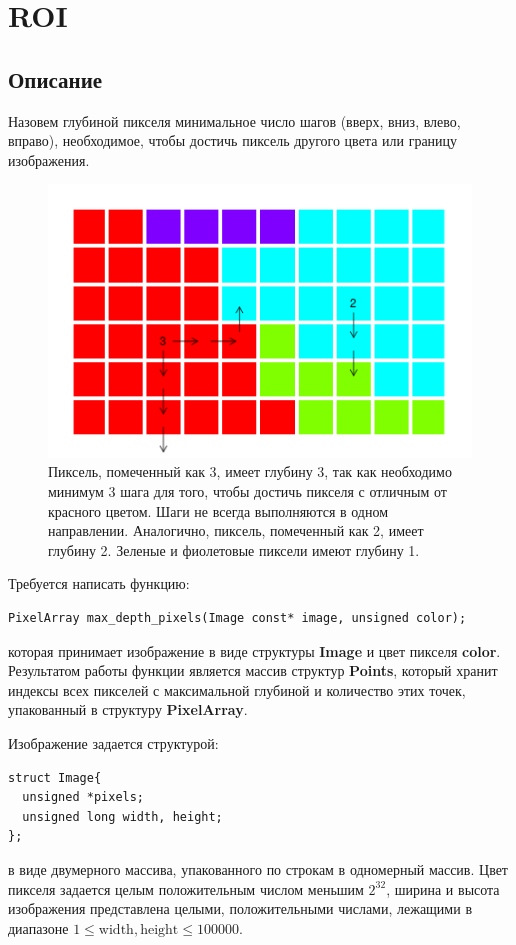 \documentclass[14pt]{article}
\begin{document}
\section{ROI}
\subsection{Описание}
Назовем глубиной пикселя минимальное число шагов (вверх, вниз, влево, вправо), необходимое, чтобы достичь пиксель другого цвета или границу изображения. 
\begin{figure}[ht]
    \centering
    \includegraphics[width=0.75\linewidth]{pixeldepthspic.png}
    \caption{\label{fig:demo} Пиксель, помеченный как 3, имеет глубину 3, так как необходимо минимум 3 шага для того, чтобы достичь пикселя с отличным от красного цветом. Шаги не всегда выполняются в одном направлении. Аналогично, пиксель, помеченный как 2, имеет глубину 2. Зеленые и фиолетовые пиксели имеют глубину 1. }
\end{figure}

Требуется написать функцию:
\begin{lstlisting}
PixelArray max_depth_pixels(Image const* image, unsigned color);
\end{lstlisting}
которая принимает изображение в виде структуры \textbf{Image} и цвет пикселя \textbf{color}. Результатом работы функции является массив структур \textbf{Points}, который хранит индексы всех пикселей с максимальной глубиной и количество этих точек, упакованный в структуру \textbf{PixelArray}. 

Изображение задается структурой:
\begin{lstlisting}
struct Image{
  unsigned *pixels;   
  unsigned long width, height;
};
\end{lstlisting}
в виде двумерного массива, упакованного по строкам в одномерный массив. Цвет пикселя задается целым положительным числом меньшим $2^{32}$, ширина и высота изображения представлена целыми, положительными числами, 
лежащими в диапазоне $1 \le \mathrm{width, height} \le 100000$.
\end{document}
